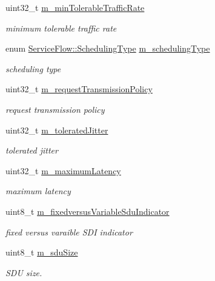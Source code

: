\begin{DoxyCompactItemize}
uint32\+\_\+t \hyperlink{classns3_1_1ServiceFlow_a3b8d632776a81daa9306c1e976685aee}{m\+\_\+min\+Tolerable\+Traffic\+Rate}
\begin{DoxyCompactList}\small\item\em minimum tolerable traffic rate \end{DoxyCompactList}\item 
enum \hyperlink{classns3_1_1ServiceFlow_a7990ba10be1e098328fd1e6382a26235}{Service\+Flow\+::\+Scheduling\+Type} \hyperlink{classns3_1_1ServiceFlow_a2d3227119fefd7969d145645cdb693af}{m\+\_\+scheduling\+Type}
\begin{DoxyCompactList}\small\item\em scheduling type \end{DoxyCompactList}\item 
uint32\+\_\+t \hyperlink{classns3_1_1ServiceFlow_a019520fe5d683d8c79465830166815ce}{m\+\_\+request\+Transmission\+Policy}
\begin{DoxyCompactList}\small\item\em request transmission policy \end{DoxyCompactList}\item 
uint32\+\_\+t \hyperlink{classns3_1_1ServiceFlow_a225bda97e6281ab2c5a5d1b9682bf21b}{m\+\_\+tolerated\+Jitter}
\begin{DoxyCompactList}\small\item\em tolerated jitter \end{DoxyCompactList}\item 
uint32\+\_\+t \hyperlink{classns3_1_1ServiceFlow_a3b511a39a2dc94f5649b127c9e7a2073}{m\+\_\+maximum\+Latency}
\begin{DoxyCompactList}\small\item\em maximum latency \end{DoxyCompactList}\item 
uint8\+\_\+t \hyperlink{classns3_1_1ServiceFlow_abcc372b51b2b646d66af51fb2231a183}{m\+\_\+fixedversus\+Variable\+Sdu\+Indicator}
\begin{DoxyCompactList}\small\item\em fixed versus varaible S\+DI indicator \end{DoxyCompactList}\item 
uint8\+\_\+t \hyperlink{classns3_1_1ServiceFlow_ac6e5539e9c678970045eb8fe247903e6}{m\+\_\+sdu\+Size}
\begin{DoxyCompactList}\small\item\em S\+DU size. \end{DoxyCompactList}\item 

\end{DoxyCompactItemize}
